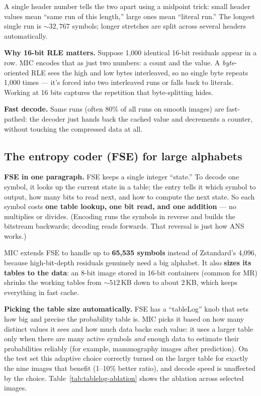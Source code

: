 \documentclass[11pt]{article}
\begin{document}
A single header number tells the two apart using a midpoint trick: small
header values mean ``same run of this length,'' large ones mean ``literal run.''
The longest single run is ${\sim}32{,}767$ symbols; longer stretches are split
across several headers automatically.

\textbf{Why 16-bit RLE matters.} Suppose 1,000 identical 16-bit residuals
appear in a row. MIC encodes that as just two numbers: a count and the value.
A \emph{byte}-oriented RLE sees the high and low bytes interleaved, so no
single byte repeats 1,000 times --- it's forced into two interleaved runs or
falls back to literals. Working at 16 bits captures the repetition that
byte-splitting hides.

\textbf{Fast decode.} Same runs (often 80\% of all runs on smooth images) are
fast-pathed: the decoder just hands back the cached value and decrements a
counter, without touching the compressed data at all.

\subsection{The entropy coder (FSE) for large alphabets}

\textbf{FSE in one paragraph.} FSE keeps a single integer ``state.'' To decode
one symbol, it looks up the current state in a table; the entry tells it which
symbol to output, how many bits to read next, and how to compute the next
state. So each symbol costs \textbf{one table lookup, one bit read, and one
addition} --- no multiplies or divides. (Encoding runs the symbols in reverse
and builds the bitstream backwards; decoding reads forwards. That reversal
is just how ANS works.)

MIC extends FSE to handle up to \textbf{65,535 symbols} instead of Zstandard's
4,096, because high-bit-depth residuals genuinely need a big alphabet. It
also \textbf{sizes its tables to the data}: an 8-bit image stored in 16-bit
containers (common for MR) shrinks the working tables from ${\sim}512$\,KB down
to about 2\,KB, which keeps everything in fast cache.

\textbf{Picking the table size automatically.} FSE has a ``tableLog'' knob that
sets how big and precise the probability table is. MIC picks it based on how
many distinct values it sees and how much data backs each value: it uses a
larger table only when there are many active symbols \emph{and} enough data to
estimate their probabilities reliably (for example, mammography images after
prediction). On the test set this adaptive choice correctly turned on the
larger table for exactly the nine images that benefit (1--10\% better ratio),
and decode speed is unaffected by the choice.
Table~\ref{tab:tablelog-ablation} shows the ablation across selected images.
\end{document}
